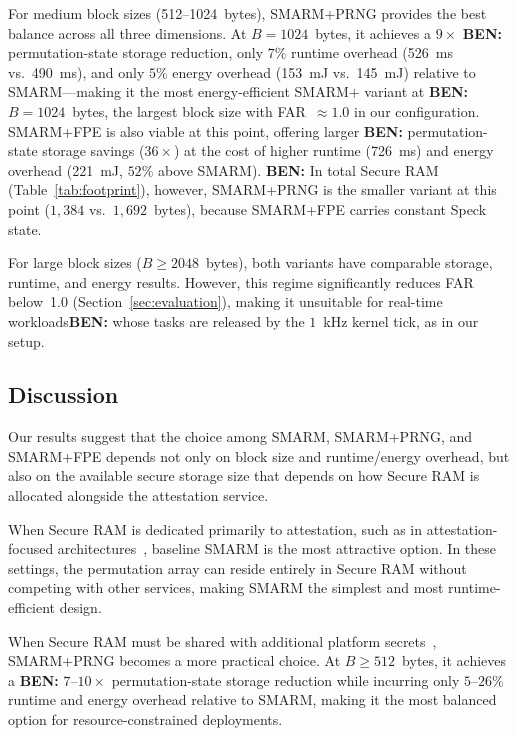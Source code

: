 \documentclass{ieeeaccess}
\DeclareRobustCommand{\ben}[1]{{\color{BENcolor}\textbf{BEN:} #1}}
\newcommand{\rtsmarm}{SMARM+\xspace}
\newcommand{\rtsmarmone}{SMARM+PRNG\xspace}
\newcommand{\rtsmarmtwo}{SMARM+FPE\xspace}
\begin{document}
For medium block sizes (512--1024~bytes), \rtsmarmone 
provides the best balance across all three dimensions. 
At $B = 1024$~bytes, it achieves a $9\times$ \ben{permutation-state} storage 
reduction, only $7\%$ runtime overhead (526~ms vs.\ 
490~ms), and only $5\%$ energy overhead (153~mJ vs.\ 
145~mJ) relative to SMARM---making it the most 
energy-efficient \rtsmarm variant at \ben{$B = 1024$~bytes, the largest block size with FAR~$\approx 1.0$ in our configuration}.
\rtsmarmtwo is also viable at this point, offering larger 
\ben{permutation-state} storage savings ($36\times$) at the cost of higher runtime 
(726~ms) and energy overhead (221~mJ, $52\%$ above SMARM).
\ben{In total Secure RAM (Table~\ref{tab:footprint}), however, \rtsmarmone is the smaller variant at this point ($1{,}384$ vs.\ $1{,}692$~bytes), because \rtsmarmtwo carries constant Speck state.}

For large block sizes ($B \geq 2048$~bytes), both variants 
have comparable storage, runtime, and energy results. 
However, this regime significantly reduces FAR 
below~1.0 (Section~\ref{sec:evaluation}), making it 
unsuitable for real-time workloads\ben{ whose tasks are released by the $1$~kHz kernel tick, as in our setup}.



\subsection{Discussion}
\label{sec:resmarm-discussion}

Our results suggest that the choice among SMARM, \rtsmarmone, and \rtsmarmtwo depends not only on block size and runtime/energy overhead, but also on the available secure storage size that depends on how Secure RAM is allocated alongside the attestation service.

When Secure RAM is dedicated primarily to attestation, such as in attestation-focused architectures~\cite{smart,hydra}, baseline SMARM is the most attractive option.
In these settings, the permutation array can reside entirely in Secure RAM without competing with other services, making SMARM the simplest and most runtime-efficient design.


When Secure RAM must be shared with additional platform 
secrets~\cite{silabs-secure-key-storage}, \rtsmarmone 
becomes a more practical choice. At $B \geq 512$~bytes, 
it achieves a \ben{$7$--$10\times$ permutation-state} storage reduction while incurring only $5$--$26\%$ runtime and energy overhead relative to SMARM, making it the most balanced option for 
resource-constrained deployments.
\end{document}
